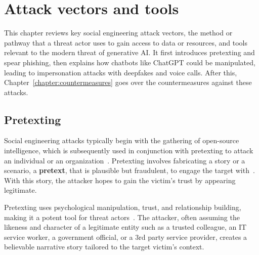 \chapter{Attack vectors and tools\label{chapter:attacks}}
\begin{comment}
\end{comment}

This chapter reviews key social engineering attack vectors, the method or pathway that a threat actor uses to gain access to data or resources, and tools relevant to the modern threat of generative AI. It first introduces pretexting and spear phishing, then explains how chatbots like ChatGPT could be manipulated, leading to impersonation attacks with deepfakes and voice calls. After this, Chapter~\ref{chapter:countermeasures} goes over the countermeasures against these attacks.



\section{Pretexting}
\begin{comment}
\end{comment}

%
%
Social engineering attacks typically begin with the gathering of open-source intelligence, which is subsequently used in conjunction with pretexting to attack an individual or an organization~\citep{hadnagy_Social_Engineering_The_Science_2018}. Pretexting involves fabricating a story or a scenario, a \textbf{pretext}, that is plausible but fraudulent, to engage the target with~\citep{wang_Defining_Social_Engineering_2020}. With this story, the attacker hopes to gain the victim's trust by appearing legitimate. 

%
%
Pretexting uses psychological manipulation, trust, and relationship building, making it a potent tool for threat actors~\citep{mitnick_The_Art_of_Deception_2003}. The attacker, often assuming the likeness and character of a legitimate entity such as a trusted colleague, an IT service worker, a government official, or a 3rd party service provider, creates a believable narrative story tailored to the target victim's context.

%
%







